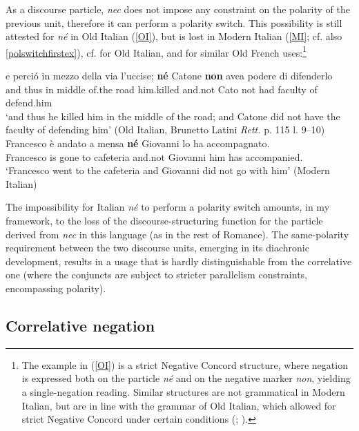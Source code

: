 \documentclass[output=paper,modfonts,nonflat,citecolor=brown,
showindex
]{langsci/langscibook}
\begin{document}
\noindent As a discourse particle, {\emph{nec}} does not impose any constraint on the polarity of the previous unit, therefore it can perform a polarity switch. This possibility is still attested for {\emph{n\'e}} in Old Italian (\ref{OI}), but is lost in Modern Italian (\ref{MI}; cf. also \ref{polswitchfirstex}), cf. \citet{Zanuttini10} for Old Italian, and \citet[]{Doetjes05} for similar Old French uses:{\footnote{The example in (\ref{OI}) is a strict Negative Concord structure, where negation is expressed both on the particle {\emph{n\'e}} and on the negative marker {\emph{non}}, yielding a single-negation reading. Similar structures are not grammatical in Modern Italian, but are in line with the grammar of Old Italian, which allowed for strict Negative Concord under certain conditions (\citealt[]{Garzonio18}; \citealt[chapter 5]{Gianollo18}).}}

{\begin{exe}
\ex
\begin{xlist}
\ex \label{OI} \gll e perci\'o in mezzo della via l'uccise; {\textbf{n\'e}} Catone {\textbf{non}} avea podere di difenderlo\\
and thus in middle of.the road him.killed and.not Cato not had faculty of defend.him\\

`and thus he killed him in the middle of the road; and Catone did not have the faculty of defending him' (Old Italian, Brunetto Latini {\emph{Rett.}} p. 115 l. 9--10)
\ex \label{MI} \gll *Francesco \`e andato a mensa {\textbf{n\'e}} Giovanni lo ha accompagnato.\\
Francesco is gone to cafeteria and.not Giovanni him has accompanied.\\

`Francesco went to the cafeteria and Giovanni did not go with him' (Modern Italian)
\end{xlist}
\end{exe}}

\noindent The impossibility for Italian {\emph{n\'e}} to perform a polarity switch amounts, in my framework, to the loss of the discourse-structuring function for the particle derived from {\emph{nec}} in this language (as in the rest of Romance). The same-polarity requirement between the two discourse units, emerging in its diachronic development, results in a usage that is hardly distinguishable from the correlative one (where the conjuncts are subject to stricter parallelism constraints, encompassing polarity).

\subsection{Correlative negation} \label{functioncorrelativeneg}
\end{document}
